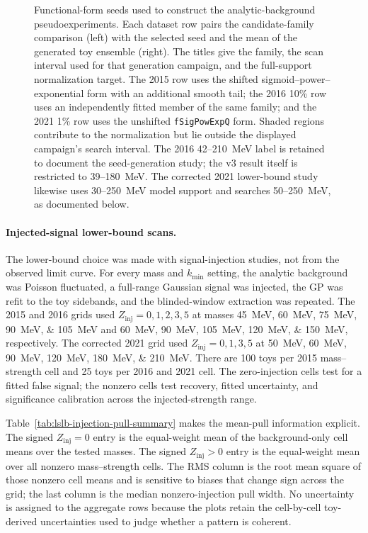 \begin{figure}[p]
\centering
{}
\caption{Functional-form seeds used to construct the analytic-background
pseudoexperiments. Each dataset row pairs the candidate-family comparison (left) with
the selected seed and the mean of the generated toy ensemble (right). The titles give
the family, the scan interval used for that generation campaign, and the full-support
normalization target. The 2015 row uses the shifted
sigmoid--power--exponential form with an additional smooth tail; the 2016 10\% row uses
an independently fitted member of the same family; and the 2021 1\% row uses the
unshifted \texttt{fSigPowExpQ} form. Shaded regions contribute to the normalization but
lie outside the displayed campaign's search interval. The 2016 42--210~MeV label is
retained to document the seed-generation study; the v3 result itself is restricted to
39--180~MeV. The corrected 2021 lower-bound study likewise uses 30--250~MeV model
support and searches 50--250~MeV, as documented below.}
\label{fig:functional-form-seed-overview}
\end{figure}

\paragraph{Injected-signal lower-bound scans.}
The lower-bound choice was made with signal-injection studies, not from the observed
limit curve. For every mass and $k_{\min}$ setting, the analytic background was
Poisson fluctuated, a full-range Gaussian signal was injected, the GP was refit to the
toy sidebands, and the blinded-window extraction was repeated. The 2015 and 2016 grids
used $Z_{\mathrm{inj}}=0,1,2,3,5$ at masses
\SIlist{45;60;75;90;105}{MeV} and \SIlist{60;90;105;120;150}{MeV}, respectively.
The corrected 2021 grid used $Z_{\mathrm{inj}}=0,1,3,5$ at
\SIlist{50;60;90;120;180;210}{MeV}. There are 100 toys per 2015 mass--strength cell
and 25 toys per 2016 and 2021 cell. The zero-injection cells test for a fitted false
signal; the nonzero cells test recovery, fitted uncertainty, and significance
calibration across the injected-strength range.

Table~\ref{tab:lslb-injection-pull-summary} makes the mean-pull information explicit.
The signed $Z_{\mathrm{inj}}=0$ entry is the equal-weight mean of the background-only
cell means over the tested masses. The signed $Z_{\mathrm{inj}}>0$ entry is the
equal-weight mean over all nonzero mass--strength cells. The RMS column is the root
mean square of those nonzero cell means and is sensitive to biases that change sign
across the grid; the last column is the median nonzero-injection pull width. No
uncertainty is assigned to the aggregate rows because the plots retain the
cell-by-cell toy-derived uncertainties used to judge whether a pattern is coherent.


